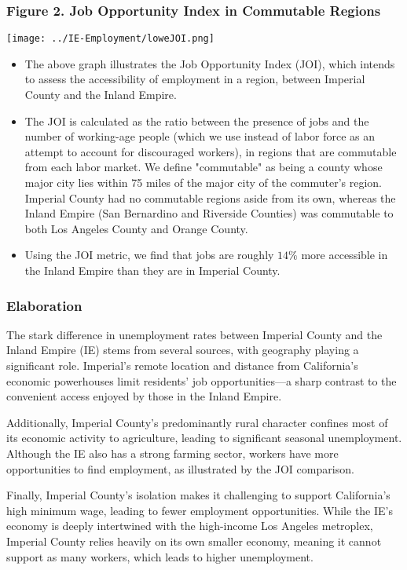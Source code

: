 \documentclass[12pt]{article}
\begin{document}
\subsubsection*{Figure 2. Job Opportunity Index in Commutable Regions}
\texttt{[image: ../IE-Employment/loweJOI.png]}

\begin{itemize}
	\item The above graph illustrates the Job Opportunity Index (JOI), which intends to assess the accessibility of employment in a region, between Imperial County and the Inland Empire.
    \item The JOI is calculated as the ratio between the presence of jobs and the number of working-age people (which we use instead of labor force as an attempt to account for discouraged workers), in regions that are commutable from each labor market. We define "commutable" as being a county whose major city lies within 75 miles of the major city of the commuter's region. Imperial County had no commutable regions aside from its own, whereas the Inland Empire (San Bernardino and Riverside Counties) was commutable to both Los Angeles County and Orange County.
	\item Using the JOI metric, we find that jobs are roughly $14\%$ more accessible in the Inland Empire than they are in Imperial County. 
\end{itemize}

\subsubsection*{Elaboration}
The stark difference in unemployment rates between Imperial County and the Inland Empire (IE) stems from several sources, with geography playing a significant role. Imperial's remote location and distance from California's economic powerhouses limit residents' job opportunities—a sharp contrast to the convenient access enjoyed by those in the Inland Empire.

Additionally, Imperial County's predominantly rural character confines most of its economic activity to agriculture, leading to significant seasonal unemployment. Although the IE also has a strong farming sector, workers have more opportunities to find employment, as illustrated by the JOI comparison.

Finally, Imperial County's isolation makes it challenging to support California's high minimum wage, leading to fewer employment opportunities. While the IE's economy is deeply intertwined with the high-income Los Angeles metroplex, Imperial County relies heavily on its own smaller economy, meaning it cannot support as many workers, which leads to higher unemployment.
\end{document}
